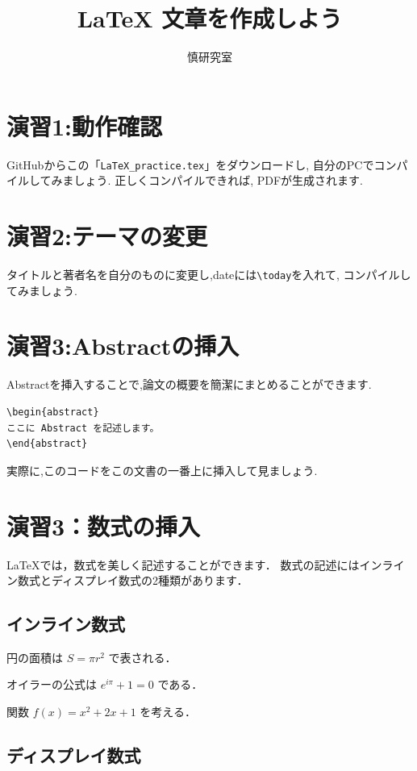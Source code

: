 \documentclass[a4paper,twocolumn]{jsarticle}
\title{LaTeX 文章を作成しよう}
\author{慎研究室}
\date{}
\begin{document}
\maketitle

\section*{演習1:動作確認}

GitHubからこの「\texttt{LaTeX\_practice.tex}」をダウンロードし,
自分のPCでコンパイルしてみましょう.
正しくコンパイルできれば, PDFが生成されます.

\section*{演習2:テーマの変更}

タイトルと著者名を自分のものに変更し,dateには\verb|\today|を入れて,
コンパイルしてみましょう.

\section*{演習3:Abstractの挿入}

Abstractを挿入することで,論文の概要を簡潔にまとめることができます.

\begin{verbatim}
\begin{abstract}
ここに Abstract を記述します。
\end{abstract}
\end{verbatim}

実際に,このコードをこの文書の一番上に挿入して見ましょう.

\section*{演習3：数式の挿入}

LaTeXでは，数式を美しく記述することができます．
数式の記述にはインライン数式とディスプレイ数式の2種類があります．

\subsection*{インライン数式}

円の面積は $S=\pi r^2$ で表される．

オイラーの公式は $e^{i\pi}+1=0$ である．

関数 $f(x)=x^2+2x+1$ を考える．

\subsection*{ディスプレイ数式}
\end{document}
